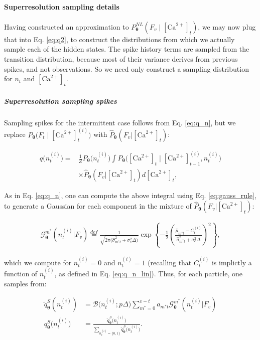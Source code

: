 \documentclass[10pt]{article}
\providecommand{\ve}[1]{\boldsymbol{#1}}
\providecommand{\ve}[1]{\boldsymbol{#1}}
\newcommand{\thetn}{\ve{\theta}}
\newcommand{\p}{P_{\thetn}}
\newcommand{\phat}{\widehat{P}_{\thetn}(F_v | \Ca_t)}
\newcommand{\m}{m^{\ast}}
\newcommand{\Ca}{[\text{Ca}^{2+}]}
\begin{document}
\paragraph{Superresolution sampling details}

Having constructed an approximation to $\p^{NL}(F_v \mid \Ca_t)$, we may now plug that into Eq. \ref{eq:q2}, to construct the distributions from which we actually sample each of the hidden states. The spike history terms are sampled from the transition distribution, because most of their variance derives from previous spikes, and not observations. So we need only construct a sampling distribution for $n_t$ and $\Ca_t$.   

\subparagraph{Superresolution sampling spikes}

Sampling spikes for the intermittent case follows from Eq. \ref{eq:q_n}, but we replace $\p \big(F_t \mid \Ca_t^{(i)} \big)$ with $\phat$:

\begin{align} \label{eq:q_n2}
q\big(n_t^{(i)}\big) =&\frac{1}{Z} \p \big( n_t^{(i)} \big) \int \p \big( \Ca_t \mid \Ca^{(i)}_{t-1}, n_t^{(i)} \big)\nonumber \\& \times \phat d\Ca_t,
\end{align}

\noindent As in Eq. \ref{eq:q_n}, one can compute the above integral using Eq. \ref{eq:gauss_rule}, to generate a Gaussian for each component in the mixture of $\phat$:

\begin{align} \label{aeq:Z_t}
\mathcal{G}_{\thetn}^{\m}(n_t^{(i)}| F_v) \stackrel{def}{=}
\frac{1}{\sqrt{2 \pi \big(\widehat{\sigma}_{\m t}^2 + \sigma_c^2 \Delta\big)}} \exp \left\{-\frac{1}{2}\left(\frac{\widehat{\mu}_{\m t} - C_t^{(i)}}{ \widehat{\sigma}_{\m t}^2 + \sigma_c^2 \Delta}\right)^2\right\},
\end{align}

\noindent which we compute for $n_t^{(i)}=0$ and $n_t^{(i)}=1$ (recalling that $C_t^{(i)}$ is implictly a function of $n_t^{(i)}$, as defined in Eq. \ref{eq:q_n_lin}).  Thus, for each particle, one samples from:

\begin{subequations} \label{aeq:qn}
\begin{align}
\widetilde{q}_{\thetn}^S(n_t^{(i)})&=\mathcal{B}\big(n_t^{(i)}; p \Delta\big) \sum_{\m=0}^{v-t} a_{\m t} \mathcal{G}_{\thetn}^{\m}(n_t^{(i)}| F_v)\\ 
q_{\thetn}^{S}\big(n_t^{(i)}\big)&=\frac{\widetilde{q}_{\thetn}^S\big(n_t^{(i)}\big)}{\sum_{n_t^{(i)}=\{0,1\}} \widetilde{q}_{\thetn}^S\big(n_t^{(i)}\big)}.
\end{align}
\end{subequations}
\end{document}

